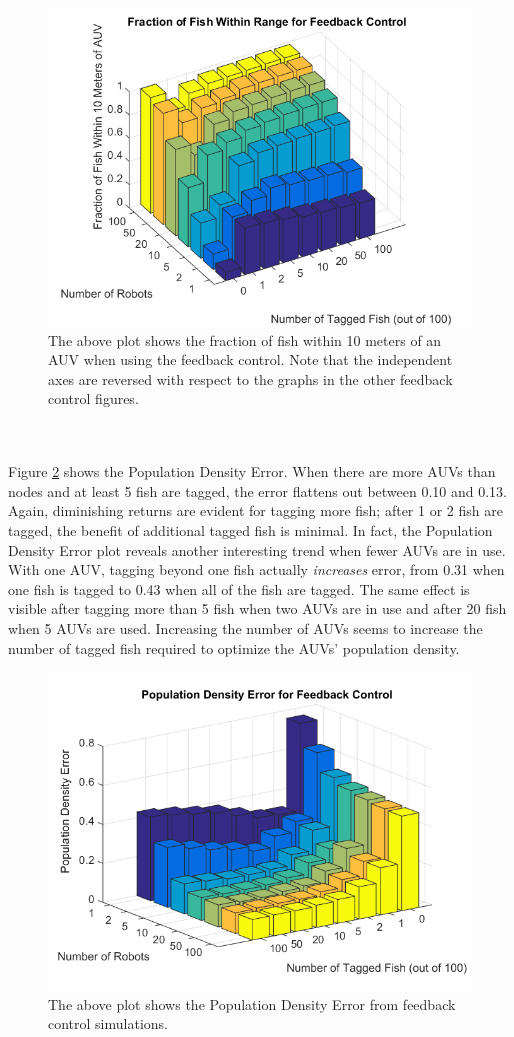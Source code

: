 \documentclass[11pt,letterpaper]{article}
\begin{document}
	\begin{figure}
		\centering
		\includegraphics[width = 0.7\linewidth]{results/feedbackFraction}
		\caption{The above plot shows the fraction of fish within 10 meters of an AUV when using the feedback control. Note that the independent axes are reversed with respect to the graphs in the other feedback control figures.}
		\label{fig:feedbackFraction}
	\end{figure}
	\\\\
	Figure \ref{fig:feedbackDensity} shows the Population Density Error. When there are more AUVs than nodes and at least 5 fish are tagged, the error flattens out between 0.10 and 0.13. Again, diminishing returns are evident for tagging more fish; after 1 or 2 fish are tagged, the benefit of additional tagged fish is minimal. In fact, the Population Density Error plot reveals another interesting trend when fewer AUVs are in use. With one AUV, tagging beyond one fish actually \textit{increases} error, from 0.31 when one fish is tagged to 0.43 when all of the fish are tagged. The same effect is visible after tagging more than 5 fish when two AUVs are in use and after 20 fish when 5 AUVs are used. Increasing the number of AUVs seems to increase the number of tagged fish required to optimize the AUVs' population density.
	\begin{figure}
		\centering
		\includegraphics[width = 0.7\linewidth]{results/feedbackDensity}
		\caption{The above plot shows the Population Density Error from feedback control simulations.}
		\label{fig:feedbackDensity}		
	\end{figure}
	
\end{document}
